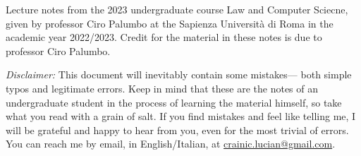 Lecture notes from the 2023 undergraduate course Law and Computer Sciecne, given by professor
Ciro Palumbo at the Sapienza Università di Roma in the academic year 2022/2023.
Credit for the material in these notes is due to professor Ciro Palumbo.

\textit{Disclaimer:} This document will inevitably contain some mistakes— both
simple typos and legitimate errors. Keep in mind that these are the notes of an
undergraduate student in the process of learning the material himself, so take
what you read with a grain of salt. If you find mistakes and feel like telling
me, I will be grateful and happy to hear from you, even for the most trivial of
errors. You can reach me by email, in English/Italian, at
\href{mailto:crainic.lucian@gmail.com}{crainic.lucian@gmail.com}.